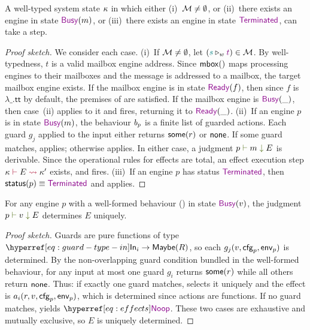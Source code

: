 \documentclass[
  a4paper,        %
  techreport,     %
]{art}
\begin{document}
\begin{proposition}\label{prop:progress}%
A well-typed system state $\SystemState$ in which either
(i)~$\SetOfMessages \neq \emptyset$, or
(ii)~there exists an engine in state $\busy{m}$,
or (iii)~there exists an engine in state $\terminated$,
can take a step.
\end{proposition}
\begin{proof}[Proof sketch]
We consider each case.
(i)~If $\SetOfMessages \neq \emptyset$, let
$\msgpacket{s}{t}{w} \in \SetOfMessages$. By well-typedness, $t$ is a valid
mailbox engine address. Since $\mailboxOf{}$ maps processing engines to their
mailboxes and the message is addressed to a mailbox, the target mailbox engine
exists. If the mailbox engine is in state $\ready{f}$, then since $f$ is
$\lambda\_.\mathsf{tt}$ by default, the premises of  are
satisfied. If the mailbox engine is $\busy{\ignore}$, then case~(ii) applies
to it and  fires, returning it to $\ready{\ignore}$.
(ii)~If an engine $p$ is in state $\busy{m}$, the behaviour $\behaviour{p}$
is a finite list of guarded actions. Each guard $g_j$ applied to the input
either returns $\some{r}$ or $\none$. If some guard matches,
 applies; otherwise  applies.
In either case, a judgment $\evalstep{p}{m}{E}$ is derivable.
Since the operational rules for effects are total, an effect execution step
$\effectevalstep{\SystemState}{E}{\SystemState'}$ exists, and
 fires.
(iii)~If an engine $p$ has status $\terminated$, then
$\equal{\status{p}}{\terminated}$ and  applies.
\end{proof}

\begin{proposition}\label{prop:effect-determinism}%
For any engine $p$ with a well-formed behaviour
() in state $\busy{v}$,
the judgment $\evalstep{p}{v}{E}$ determines $E$ uniquely.
\end{proposition}
\begin{proof}[Proof sketch]
Guards are pure functions of type $\In{i} \to \Option{\returntype}$, so each
$g_j(v, \config{p}, \localenv{p})$ is determined. By the non-overlapping guard
condition bundled in the well-formed behaviour, for any input at most one guard
$g_i$ returns $\some{r}$ while all others return $\none$. Thus: if exactly one guard matches,
 selects it uniquely and the effect is
$a_i(r, v, \config{p}, \localenv{p})$, which is determined since actions are
functions. If no guard matches,  yields $\noop$. These
two cases are exhaustive and mutually exclusive, so $E$ is uniquely determined.
\end{proof}
\end{document}
